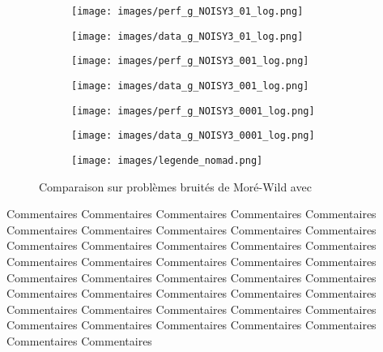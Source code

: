 	\begin{figure}[!htb] %
		\centering
		\begin{subfigure}{0.43\textwidth}
			\texttt{[image: images/perf\_g\_NOISY3\_01\_log.png]}
		\end{subfigure}%
		\begin{subfigure}{0.43\textwidth}
			\texttt{[image: images/data\_g\_NOISY3\_01\_log.png]}
		\end{subfigure}
		\smallskip
		\begin{subfigure}{0.43\textwidth}
			\texttt{[image: images/perf\_g\_NOISY3\_001\_log.png]}
		\end{subfigure}%
		\begin{subfigure}{0.43\textwidth}
			\texttt{[image: images/data\_g\_NOISY3\_001\_log.png]}
		\end{subfigure}
		\smallskip
		\begin{subfigure}{0.43\textwidth}
			\texttt{[image: images/perf\_g\_NOISY3\_0001\_log.png]}
		\end{subfigure}%
		\begin{subfigure}{0.43\textwidth}
			\texttt{[image: images/data\_g\_NOISY3\_0001\_log.png]}
		\end{subfigure}
		\smallskip
		\begin{subfigure}{0.95\textwidth}
			\texttt{[image: images/legende\_nomad.png]}
		\end{subfigure}
		\caption{Comparaison sur problèmes bruités de Moré-Wild avec \CS} \label{fig:3}
	\end{figure}
	\clearpage
	Commentaires Commentaires Commentaires Commentaires Commentaires Commentaires Commentaires Commentaires Commentaires Commentaires Commentaires Commentaires Commentaires Commentaires Commentaires Commentaires Commentaires Commentaires Commentaires Commentaires Commentaires Commentaires Commentaires Commentaires Commentaires Commentaires Commentaires Commentaires Commentaires Commentaires Commentaires Commentaires Commentaires Commentaires Commentaires Commentaires Commentaires Commentaires Commentaires Commentaires Commentaires Commentaires 
	\clearpage
